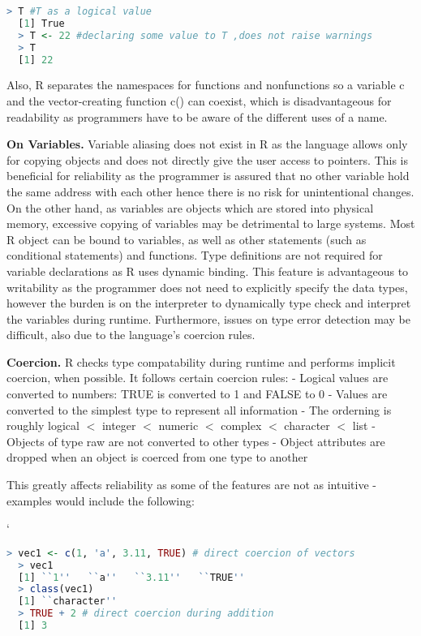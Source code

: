 \documentclass[12pt]{article}
\begin{document}
\begin{lstlisting}[language=R]
  > T #T as a logical value
  [1] True
  > T <- 22 #declaring some value to T ,does not raise warnings
  > T
  [1] 22
\end{lstlisting}

Also, R separates the namespaces for functions and nonfunctions so a variable c and the vector-creating function c() can coexist, which is disadvantageous for readability as programmers have to be aware of the different uses of a name.

\textbf{On Variables.} Variable aliasing does not exist in R as the language allows only for copying objects and does not directly give the user access to pointers. This is beneficial for reliability as the programmer is assured that no other variable hold the same address with each other hence there is no risk for unintentional changes. On the other hand, as variables are objects which are stored into physical memory, excessive copying of variables may be detrimental to large systems. Most R object can be bound to variables, as well as other statements (such as conditional statements) and functions. Type definitions are not required for variable declarations as R uses dynamic binding. This feature is advantageous to writability as the programmer does not need to explicitly specify the data types, however the burden is on the interpreter to dynamically type check and interpret the variables during runtime. Furthermore, issues on type error detection may be difficult, also due to the language's coercion rules.

\textbf{Coercion.} R checks type compatability during runtime and performs implicit coercion, when possible. It follows certain coercion rules:
- Logical values are converted to numbers: TRUE is converted to 1 and FALSE to 0
- Values are converted to the simplest type to represent all information
- The orderning is roughly logical \(<\) integer \(<\) numeric \(<\) complex \(<\) character \(<\) list
- Objects of type raw are not converted to other types
- Object attributes are dropped when an object is coerced from one type to another

This greatly affects reliability as some of the features are not as intuitive - examples would include the following:

`\begin{lstlisting}[language=R]
  > vec1 <- c(1, 'a', 3.11, TRUE) # direct coercion of vectors
  > vec1
  [1] ``1''   ``a''   ``3.11''   ``TRUE''
  > class(vec1)
  [1] ``character''
  > TRUE + 2 # direct coercion during addition
  [1] 3
\end{lstlisting}
\end{document}
